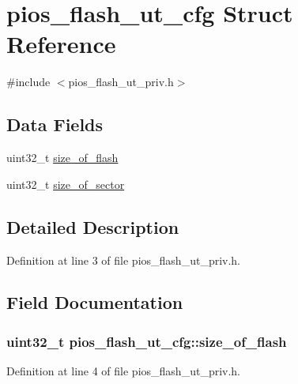 \hypertarget{structpios__flash__ut__cfg}{\section{pios\-\_\-flash\-\_\-ut\-\_\-cfg \-Struct \-Reference}
\label{structpios__flash__ut__cfg}
}


{\ttfamily \#include $<$pios\-\_\-flash\-\_\-ut\-\_\-priv.\-h$>$}

\subsection*{\-Data \-Fields}
\begin{DoxyCompactItemize}
\item 
uint32\-\_\-t \hyperlink{structpios__flash__ut__cfg_a8f3cb41fec03728a72f505bfb41227c0}{size\-\_\-of\-\_\-flash}
\item 
uint32\-\_\-t \hyperlink{structpios__flash__ut__cfg_aa71a1f1da59549e862bcdbeae72174b8}{size\-\_\-of\-\_\-sector}
\end{DoxyCompactItemize}


\subsection{\-Detailed \-Description}


\-Definition at line 3 of file pios\-\_\-flash\-\_\-ut\-\_\-priv.\-h.



\subsection{\-Field \-Documentation}
\hypertarget{structpios__flash__ut__cfg_a8f3cb41fec03728a72f505bfb41227c0}{
\subsubsection[{size\-\_\-of\-\_\-flash}]{\setlength{\rightskip}{0pt plus 5cm}uint32\-\_\-t {\bf pios\-\_\-flash\-\_\-ut\-\_\-cfg\-::size\-\_\-of\-\_\-flash}}}\label{structpios__flash__ut__cfg_a8f3cb41fec03728a72f505bfb41227c0}


\-Definition at line 4 of file pios\-\_\-flash\-\_\-ut\-\_\-priv.\-h.

